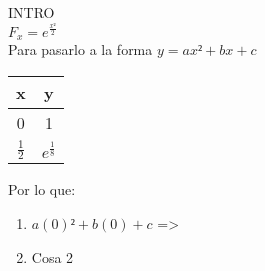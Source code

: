 \documentclass{article}
\begin{document}
\Large INTRO \\
  $ {F_{x}} = {e^\frac{x²}{2}} $ \\
  Para pasarlo a la forma $ {y}={ax²}+{bx}+{c} $
  \begin{table}
    \begin{center}
      \begin{tabular}{c|c}
        \textbf{x} & \textbf{y}\\
        \hline
        0 & 1 \\
        $\frac{1}{2}$ & ${e^\frac{1}{8}}$
      \end{tabular}
    \end{center}
  \end{table}
  Por lo que:
  \begin{enumerate}
    \item
      $ {a(0)²} + {b(0)} + {c} $ => 
    \item
      Cosa 2
  \end{enumerate}
\end{document}
